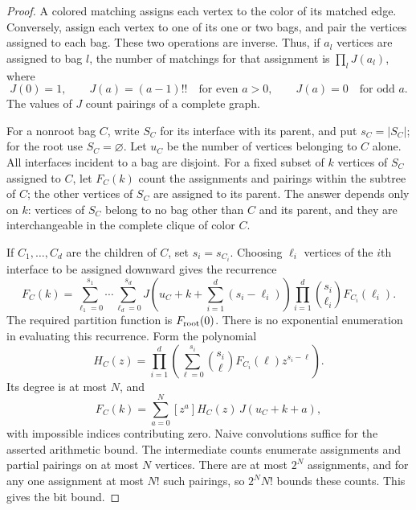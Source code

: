 \documentclass[11pt]{article}
\theoremstyle{definition}
\theoremstyle{remark}
\numberwithin{equation}{section}
\begin{document}
\begin{proof}
A colored matching assigns each vertex to the color of its matched
edge. Conversely, assign each vertex to one of its one or two bags,
and pair the vertices assigned to each bag. These two operations are
inverse. Thus, if $a_l$ vertices are assigned to bag $l$, the number of
matchings for that assignment is $\prod_l J(a_l)$, where
\[
 J(0)=1,\qquad J(a)=(a-1)!!\quad\text{for even }a>0,
 \qquad J(a)=0\quad\text{for odd }a.
\]
The values of $J$ count pairings of a complete graph.

For a nonroot bag $C$, write $S_C$ for its interface with its parent,
and put $s_C=|S_C|$; for the root use $S_C=\varnothing$.
Let $u_C$ be the number of vertices belonging to $C$ alone.
All interfaces incident to a bag are disjoint.
For a fixed subset of $k$ vertices of $S_C$ assigned to $C$, let
$F_C(k)$ count the assignments and pairings within the subtree of $C$;
the other vertices of $S_C$ are assigned to its parent.
The answer depends only on $k$: vertices of $S_C$ belong to no bag
other than $C$ and its parent, and they are interchangeable in the
complete clique of color $C$.

If $C_1,\ldots,C_d$ are the children of $C$, set $s_i=s_{C_i}$.
Choosing $\ell_i$ vertices of the $i$th interface to be assigned
downward gives the recurrence
\begin{equation}\label{eq:base-dp}
 F_C(k)=\sum_{\ell_1=0}^{s_1}\cdots\sum_{\ell_d=0}^{s_d}
 J\!\left(u_C+k+\sum_{i=1}^d(s_i-\ell_i)\right)
 \prod_{i=1}^d\binom{s_i}{\ell_i}F_{C_i}(\ell_i).
\end{equation}
The required partition function is $F_{\rm root}(0)$.
There is no exponential enumeration in evaluating this recurrence.
Form the polynomial
\[
 H_C(z)=\prod_{i=1}^d
 \left(\sum_{\ell=0}^{s_i}
       \binom{s_i}{\ell}F_{C_i}(\ell)z^{s_i-\ell}\right).
\]
Its degree is at most $N$, and
\[
 F_C(k)=\sum_{a=0}^N[z^a]H_C(z)\,J(u_C+k+a),
\]
with impossible indices contributing zero. Naive convolutions suffice
for the asserted arithmetic bound. The intermediate counts enumerate
assignments and partial pairings on at most $N$ vertices. There are
at most $2^N$ assignments, and for any one assignment at most $N!$
such pairings, so $2^N N!$ bounds these counts. This gives the bit bound.


\end{proof}
\end{document}
